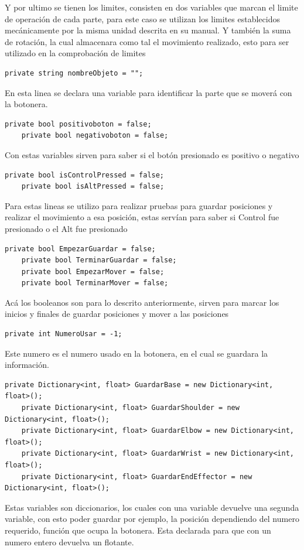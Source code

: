 Y por ultimo se tienen los limites, consisten en dos variables que marcan el limite de operación de cada parte, para este caso se utilizan los limites establecidos mecánicamente por la misma unidad descrita en su manual. Y también la suma de rotación, la cual almacenara como tal el movimiento realizado, esto para ser utilizado en la comprobación de limites

\begin{lstlisting}[frame=single]
    private string nombreObjeto = "";
\end{lstlisting}
En esta linea se declara una variable para identificar la parte que se moverá con la botonera.

\begin{lstlisting}[frame=single]
    private bool positivoboton = false;
    private bool negativoboton = false;
\end{lstlisting}
Con estas variables sirven para saber si el botón presionado es positivo o negativo

\begin{lstlisting}[frame=single]
    private bool isControlPressed = false;
    private bool isAltPressed = false;
\end{lstlisting}
Para estas lineas se utilizo para realizar pruebas para guardar posiciones y realizar el movimiento a esa posición, estas servían para saber si Control fue presionado o el Alt fue presionado

\begin{lstlisting}[frame=single]
    private bool EmpezarGuardar = false;
    private bool TerminarGuardar = false;
    private bool EmpezarMover = false;
    private bool TerminarMover = false;
\end{lstlisting}
Acá los booleanos son para lo descrito anteriormente, sirven para marcar los inicios y finales de guardar posiciones y mover a las posiciones

\begin{lstlisting}[frame=single]
    private int NumeroUsar = -1;
\end{lstlisting}
Este numero es el numero usado en la botonera, en el cual se guardara la información.

\begin{lstlisting}[frame=single]
    private Dictionary<int, float> GuardarBase = new Dictionary<int, float>();
    private Dictionary<int, float> GuardarShoulder = new Dictionary<int, float>();
    private Dictionary<int, float> GuardarElbow = new Dictionary<int, float>();
    private Dictionary<int, float> GuardarWrist = new Dictionary<int, float>();
    private Dictionary<int, float> GuardarEndEffector = new Dictionary<int, float>();
\end{lstlisting}
Estas variables son diccionarios, los cuales con una variable devuelve una segunda variable, con esto poder guardar por ejemplo, la posición dependiendo del numero requerido, función que ocupa la botonera. Esta declarada para que con un numero entero devuelva un flotante.


